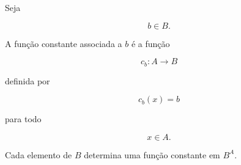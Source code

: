 \documentclass[../../main]{subfiles}
\begin{document}
\begin{defn}
	\label{def:matematica:funcoes:espacos:constante}

	Seja

	\[
		b\in B.
	\]

	A função constante associada a \(b\) é a função

	\[
		c_b:A\to B
	\]

	definida por

	\[
		c_b(x)=b
	\]

	para todo

	\[
		x\in A.
	\]

\end{defn}

\begin{obs}

	Cada elemento de \(B\) determina uma função constante em \(B^A\).

\end{obs}
\end{document}
